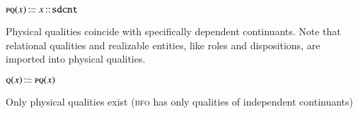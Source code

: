 \documentclass[ao]{iosart2x}
\newcommand{\nb}[1]{\textcolor{red}{$|$}\marginpar{\hspace*{-0cm}\parbox{20mm}{\scriptsize\raggedright\textcolor{red}{#1}}}}
\newcommand{\bdDefLabel}{\textrm{d$_\texttt{bd}$}}
\newcounter{cntbddf}
\newcommand{\bddf}[1]{\refstepcounter{cntbddf}\begin{small}{\bf \bdDefLabel\thecntbddf\label{#1}}\end{small}}
\newcommand{\pr}[1]{\mathtt{#1}}
\newcommand{\cn}[1]{\mathtt{#1}}
\newcommand\textequal{%
 \rule[.08ex]{5pt}{0.35pt}\llap{\rule[.78ex]{5pt}{0.35pt}}}
\newcommand{\sdef}{{\hspace{1.5pt}:\hspace{-2.5pt}\textequal\hspace{3pt}}}
\newcommand{\dolce}{{\textsc{dolce}}}
\newcommand{\bfo}{{\textsc{bfo}}}
\newcommand {\ASdcat} {\textsc{as}}
\newcommand {\EDdcat} {\textsc{ed}}
\newcommand {\NPEDdcat} {\textsc{nped}}
\newcommand {\PEDdcat} {\textsc{ped}}
\newcommand {\PQdcat} {\textsc{pq}}
\newcommand {\Qdcat} {\textsc{q}}
\newcommand {\SLdcat} {\textsc{sl}}
\newcommand {\DQTd} {\ensuremath{\pr{DQT}}}
\newcommand {\SDd} {\ensuremath{\pr{SD}}}
\newcommand{\sdcntbcat}{\cn{sdcnt}}
\newcommand{\rqltbcat}{\cn{rqlt}}
\newcommand{\bfopartic}{\textsc{par}}
\newcommand{\bfoiof}[1]{{\,::_{#1\:\!}}}
\begin{document}

\item[\bddf{b2d_PQdcat}] $\PQdcat(x)\sdef x \bfoiof{} \sdcntbcat$

\vspace{1pt}
Physical qualities coincide with specifically dependent continuants. Note that relational qualities and realizable entities, like roles and dispositions, are imported into physical qualities. %


%
%

%
%

\item[\bddf{b2d_Qdcat}] $\Qdcat(x) \sdef \PQdcat(x)$ 

\vspace{1pt}
Only physical qualities exist ({\bfo} has only qualities of independent continuants)
\end{document}
